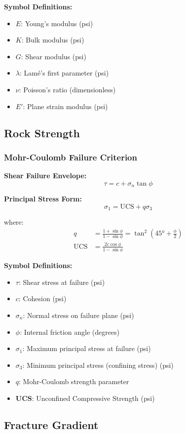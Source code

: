 \documentclass[11pt,a4paper]{article}
\newcommand{\symitem}[2]{\item \textbf{#1}: #2}
\begin{document}
\textbf{Symbol Definitions:}
\begin{itemize}[leftmargin=2cm]
\symitem{$E$}{Young's modulus (psi)}
\symitem{$K$}{Bulk modulus (psi)}
\symitem{$G$}{Shear modulus (psi)}
\symitem{$\lambda$}{Lamé's first parameter (psi)}
\symitem{$\nu$}{Poisson's ratio (dimensionless)}
\symitem{$E'$}{Plane strain modulus (psi)}
\end{itemize}

\subsection{Rock Strength}

\subsubsection{Mohr-Coulomb Failure Criterion}

\begin{tcolorbox}[colback=formulabox,colframe=black!75]
\textbf{Shear Failure Envelope:}
\begin{equation}
\tau = c + \sigma_n \tan\phi
\end{equation}

\textbf{Principal Stress Form:}
\begin{equation}
\sigma_1 = \text{UCS} + q \sigma_3
\end{equation}

where:
\begin{align}
q &= \frac{1 + \sin\phi}{1 - \sin\phi} = \tan^2\left(45° + \frac{\phi}{2}\right) \\
\text{UCS} &= \frac{2c \cos\phi}{1 - \sin\phi}
\end{align}
\end{tcolorbox}

\textbf{Symbol Definitions:}
\begin{itemize}[leftmargin=2cm]
\symitem{$\tau$}{Shear stress at failure (psi)}
\symitem{$c$}{Cohesion (psi)}
\symitem{$\sigma_n$}{Normal stress on failure plane (psi)}
\symitem{$\phi$}{Internal friction angle (degrees)}
\symitem{$\sigma_1$}{Maximum principal stress at failure (psi)}
\symitem{$\sigma_3$}{Minimum principal stress (confining stress) (psi)}
\symitem{$q$}{Mohr-Coulomb strength parameter}
\symitem{UCS}{Unconfined Compressive Strength (psi)}
\end{itemize}

\subsection{Fracture Gradient}
\end{document}
